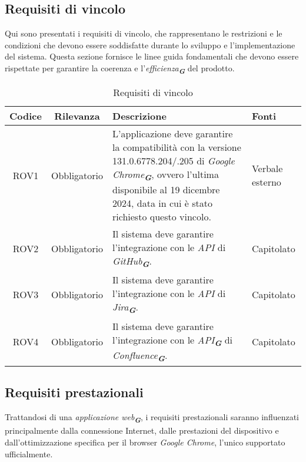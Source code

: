 \subsection{Requisiti di vincolo}
\label{sec:req_vincolo}
Qui sono presentati i requisiti di vincolo, che rappresentano le restrizioni e le condizioni
che devono essere soddisfatte durante lo sviluppo e l'implementazione del sistema. Questa
sezione fornisce le linee guida fondamentali che devono essere rispettate per garantire la
coerenza e l'\emph{efficienza}\textsubscript{\textit{\textbf{G}}} del prodotto.
\begin{table}[h!]
    \centering
    \renewcommand{\arraystretch}{1.6} %
    \begin{tabularx}{\textwidth}{|>{\centering\arraybackslash}c|>{\centering\arraybackslash}c|>{\centering\arraybackslash}X|>{\centering\arraybackslash}p{3cm}|} \hline
    \rowcolor[HTML]{FFD700} 
    \textbf{Codice} & \textbf{Rilevanza} & \textbf{Descrizione} & \textbf{Fonti} \\ \hline
	ROV1 & Obbligatorio & L'applicazione deve garantire la compatibilità con la versione 131.0.6778.204/.205 di \emph{Google Chrome}\textsubscript{\textit{\textbf{G}}}, ovvero l'ultima disponibile al 19 dicembre 2024, data in cui è stato richiesto questo vincolo. & Verbale esterno \\ \hline
    ROV2 & Obbligatorio & Il sistema deve garantire l'integrazione con le \emph{API} di \emph{GitHub}\textsubscript{\textit{\textbf{G}}}. & Capitolato \\ \hline
    ROV3 & Obbligatorio & Il sistema deve garantire l'integrazione con le \emph{API} di \emph{Jira}\textsubscript{\textit{\textbf{G}}}. & Capitolato \\ \hline
    ROV4 & Obbligatorio & Il sistema deve garantire l'integrazione con le \emph{API}\textsubscript{\textit{\textbf{G}}} di \emph{Confluence}\textsubscript{\textit{\textbf{G}}}. & Capitolato \\ \hline
    \end{tabularx}
    \caption{Requisiti di vincolo}
    \label{tab:Requisiti_di_vincolo}
\end{table}

\subsection{Requisiti prestazionali}
\label{sec:req_prestazionali}
Trattandosi di una \emph{applicazione web}\textsubscript{\textit{\textbf{G}}}, i requisiti prestazionali saranno influenzati principalmente dalla connessione Internet, 
dalle prestazioni del dispositivo e dall'ottimizzazione specifica per il browser \emph{Google Chrome}, l'unico supportato ufficialmente.

